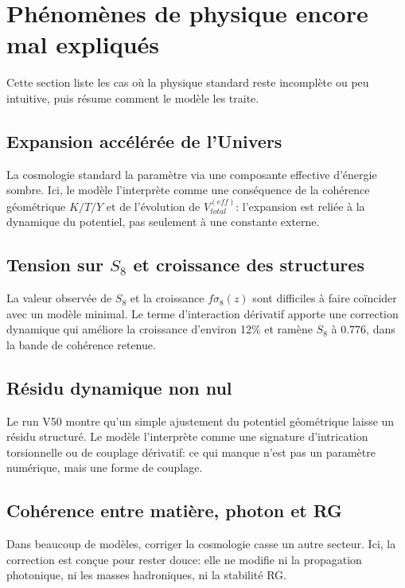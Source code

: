 \documentclass[11pt,a4paper]{article}
\begin{document}
\section{Phénomènes de physique encore mal expliqués}
Cette section liste les cas où la physique standard reste incomplète ou peu intuitive, puis résume comment le modèle les traite.

\subsection{Expansion accélérée de l'Univers}
La cosmologie standard la paramètre via une composante effective d'énergie sombre. Ici, le modèle l'interprète comme une conséquence de la cohérence géométrique $K/T/Y$ et de l'évolution de $V_{total}^{(eff)}$: l'expansion est reliée à la dynamique du potentiel, pas seulement à une constante externe.

\subsection{Tension sur $S_8$ et croissance des structures}
La valeur observée de $S_8$ et la croissance $f\sigma_8(z)$ sont difficiles à faire coïncider avec un modèle minimal. Le terme d'interaction dérivatif apporte une correction dynamique qui améliore la croissance d'environ 12\% et ramène $S_8$ à $0.776$, dans la bande de cohérence retenue.

\subsection{Résidu dynamique non nul}
Le run V50 montre qu'un simple ajustement du potentiel géométrique laisse un résidu structuré. Le modèle l'interprète comme une signature d'intrication torsionnelle ou de couplage dérivatif: ce qui manque n'est pas un paramètre numérique, mais une forme de couplage.

\subsection{Cohérence entre matière, photon et RG}
Dans beaucoup de modèles, corriger la cosmologie casse un autre secteur. Ici, la correction est conçue pour rester douce: elle ne modifie ni la propagation photonique, ni les masses hadroniques, ni la stabilité RG.
\end{document}
